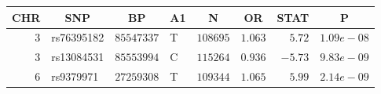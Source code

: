 \begin{center}
\begin{tabular}{rlrlrrrr}
\hline\hline
\multicolumn{1}{c}{CHR}&\multicolumn{1}{c}{SNP}&\multicolumn{1}{c}{BP}&\multicolumn{1}{c}{A1}&\multicolumn{1}{c}{N}&\multicolumn{1}{c}{OR}&\multicolumn{1}{c}{STAT}&\multicolumn{1}{c}{P}\tabularnewline
\hline
$3$&rs76395182&$85547337$&T&$108695$&$1.063$&$ 5.72$&$1.09e-08$\tabularnewline
$3$&rs13084531&$85553994$&C&$115264$&$0.936$&$-5.73$&$9.83e-09$\tabularnewline
$6$&rs9379971&$27259308$&T&$109344$&$1.065$&$ 5.99$&$2.14e-09$\tabularnewline
\hline
\end{tabular}\end{center}
